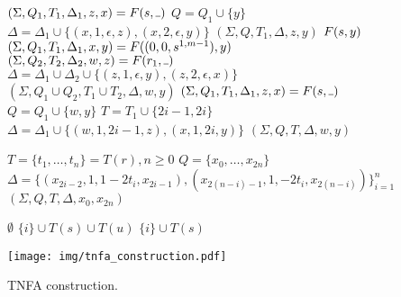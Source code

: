 \documentclass[AMA,STIX1COL]{WileyNJD-v2}
\newcommand{\Xund}{\rule{.4em}{.4pt}}
\begin{document}
\begin{figure*}
\begin{multicols}{2}
\begin{algorithm}[H]
{{        }
        \BlankLine
         {
            $(\Sigma, Q_1, T_1, \Delta_1, z, x) = \retonfa (s, \Xund)$ \;
            $Q = Q_1 \cup \{y\}$ \;
            $\Delta = \Delta_1 \cup \{(x,1,\epsilon,z), (x,2,\epsilon,y)\}$ \;
            \Return $(\Sigma, Q, T_1, \Delta, z, y)$
        }
        \BlankLine
         {
            \Return $F (s, y)$
        }
        \BlankLine
         {
            $(\Sigma, Q_1, T_1, \Delta_1, x, y) = F ((0, 0, s^{1,m-1}), y)$ \;
            $(\Sigma, Q_2, T_2, \Delta_2, w, z) = \retonfa (r_1, \Xund)$ \;
            $\Delta = \Delta_1 \cup \Delta_2 \cup \{(z,1,\epsilon,y), (z,2,\epsilon,x)\}$ \;
            \Return $(\Sigma, Q_1 \cup Q_2, T_1 \cup T_2, \Delta, w, y)$
        }
        \BlankLine
        \ElseIf {$r = (i, \Xund, s) \mid_{i \neq 0}$} {
            $(\Sigma, Q_1, T_1, \Delta_1, z, x) = \retonfa (s, \Xund)$ \;
            $Q = Q_1 \cup \{w, y\}$ \;
            $T = T_1 \cup \{2i\!-\!1, 2i\}$ \;
            $\Delta = \Delta_1 \cup \{(w,1,2i\!-\!1,z), (x,1,2i,y)\}$ \;
            \Return $(\Sigma, Q, T, \Delta, w, y)$
        }
    }
    \end{algorithm}


    \begin{algorithm}[H] \DontPrintSemicolon {}
     {
        $T = \{ t_1, \dots, t_n \} = T(r), n \geq 0$ \;
        $Q = \{x_0, \dots, x_{2n}\}$ \;
        $\Delta = \{(x_{2i-2},1,1\!-\!2t_i, x_{2i-1}), (x_{2(n-i)-1}, 1, -\!2t_i, x_{2(n - i)})\}_{i=1}^{n}$ \;
        \Return $(\Sigma, Q, T, \Delta, x_0, x_{2n})$ \;
    }
    \end{algorithm}


    \begin{algorithm}[H] \DontPrintSemicolon {}
    \Fn {$\underline{T((i, \Xund, r))} \smallskip$} {
         {
            \Return $\emptyset$
        }
         {
            \Return $\{i\} \cup T(s) \cup T(u)$
        }
         {
            \Return $\{i\} \cup T(s)$
        }
    }
    \end{algorithm}


    \columnbreak


    \texttt{[image: img/tnfa\_construction.pdf]}


\end{multicols}
\vspace{-2em}
\caption{TNFA construction.}
\end{figure*}
\end{document}
